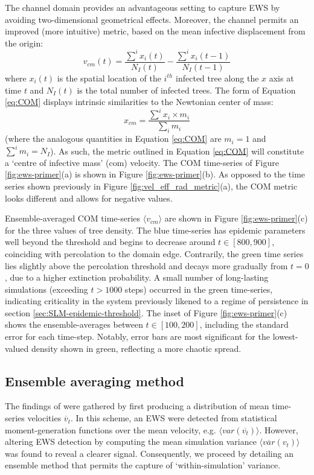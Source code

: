 The channel domain provides an advantageous setting to capture EWS by avoiding two-dimensional geometrical effects.
Moreover, the channel permits an improved (more intuitive) metric, based on the mean infective displacement from the origin:
\begin{equation}
   v_{cm}(t) = \frac{\sum^i x_i(t)}{N_I(t)} - \frac{\sum^i x_i(t-1)}{N_I(t-1)}
   \label{eq:COM}
\end{equation}
where $x_i(t)$ is the spatial location of the $i^{th}$ infected tree along the $x$ axis at time $t$ and $N_I(t)$ is the total number of infected trees. 
The form of Equation \ref{eq:COM} displays intrinsic similarities to the Newtonian center of mass:
 \[x_{cm} = \frac{\sum^i x_i\times m_i}{\sum_i m_i}\]
(where the analogous quantities in Equation \ref{eq:COM} are $m_i=1$ and $\sum^im_i= N_I$).
As such, the metric outlined in Equation \ref{eq:COM} will constitute a `centre of infective mass' (\acrshort{com}) velocity.
The COM time-series of Figure \ref{fig:ews-primer}(a) is shown in Figure \ref{fig:ews-primer}(b).
As opposed to the time series shown previously in Figure \ref{fig:vel_eff_rad_metric}(a), the COM metric looks different and allows for negative values.

Ensemble-averaged COM time-series $\langle v_{cm}\rangle$ are shown in Figure \ref{fig:ews-primer}(c) for the three values of tree density.
The blue time-series has epidemic parameters well beyond the threshold and begins to decrease around $t \in [800, 900]$, coinciding with percolation to the domain edge.
Contrarily, the green time series lies slightly above the percolation threshold and decays more gradually from $t=0$, due to a higher extinction probability. 
A small number of long-lasting simulations (exceeding $t>1000$ steps) occurred in the green time-series, indicating criticality in the system\textemdash 
previously likened to a regime of persistence in section \ref{sec:SLM-epidemic-threshold}.
The inset of Figure \ref{fig:ews-primer}(c) shows the ensemble-averages between $t\in [100, 200]$, including the standard error for each time-step.
Notably, error bars are most significant for the lowest-valued density shown in green, reflecting a more chaotic spread.

\subsection{Ensemble averaging method}

The findings of \cite{OROZCOFUENTES201912} were gathered by first producing a distribution of mean time-series velocities $\overline{v}_t$.
In this scheme, an EWS were detected from statistical moment-generation functions over the mean velocity, e.g. $\big\langle var(\overline{v_t}) \big\rangle $.
However, altering EWS detection by computing the mean simulation variance $ \big\langle \overline{var}({v}_t) \big\rangle $ was found to reveal a clearer signal.
Consequently, we proceed by detailing an ensemble method that permits the capture of `within-simulation' variance. 

